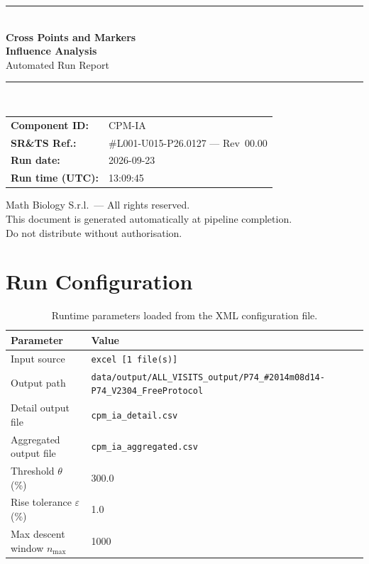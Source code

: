 \documentclass[a4paper,11pt]{article}
\begin{document}
\begin{titlepage}
\begin{center}
  \vspace*{1.8cm}
  {\color{dmaaccent}\rule{\linewidth}{1.5pt}}\\[0.6cm]
  {\LARGE\bfseries\color{dmaaccent}
    Cross Points and Markers\\[0.25cm]
    Influence Analysis}\\[0.4cm]
  {\Large Automated Run Report}\\[0.3cm]
  {\color{dmaaccent}\rule{\linewidth}{1.5pt}}\\[2cm]

  \begin{tabular}{ll}
    \textbf{Component ID:}   & CPM-IA \\[0.3cm]
    \textbf{SR\&TS Ref.:}    & \#L001-U015-P26.0127 --- Rev~00.00 \\[0.3cm]
    \textbf{Run date:}       & 2026-09-23 \\[0.3cm]
    \textbf{Run time (UTC):} & 13:09:45 \\
  \end{tabular}

  \vfill
  {\color{dmagray}\small
    Math Biology S.r.l.\ --- All rights reserved.\\
    This document is generated automatically at pipeline completion.\\
    Do not distribute without authorisation.}
\end{center}
\end{titlepage}

\tableofcontents
\clearpage

\section{Run Configuration}

\begin{table}[h!]
\centering
\small
\caption{Runtime parameters loaded from the XML configuration file.}
\begin{tabular}{ll}
\toprule
\textbf{Parameter} & \textbf{Value} \\
\midrule
Input source                      & \texttt{excel [1 file(s)]} \\
Output path                       & \texttt{data/output/ALL\_VISITS\_output/P74\_\#2014m08d14-P74\_V2304\_FreeProtocol} \\
Detail output file                & \texttt{cpm\_ia\_detail.csv} \\
Aggregated output file            & \texttt{cpm\_ia\_aggregated.csv} \\
Threshold $\theta$ (\%)           & 300.0 \\
Rise tolerance $\varepsilon$ (\%) & 1.0 \\
Max descent window $n_{\max}$     & 1000 \\
\bottomrule
\end{tabular}
\end{table}
\end{document}
